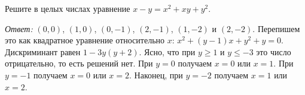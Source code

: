Решите в целых числах уравнение $x - y = x^2 + x y + y^2$.

\solution
\emph{Ответ:} $(0, 0)$, $(1, 0)$, $(0, -1)$, $(2, -1)$, $(1, -2)$ и $(2, -2)$.
Перепишем это как квадратное уравнение относительно $x$:
$x^2 + (y - 1) x + y^2 + y = 0$.
Дискриминант равен $1 - 3 y (y + 2)$.
Ясно, что при $y \geq 1$ и $y \leq -3$ это число отрицательно, то есть
решений нет.
При $y = 0$ получаем $x = 0$ или $x = 1$.
При $y = -1$ получаем $x = 0$ или $x = 2$.
Наконец, при $y = -2$ получаем $x = 1$ или $x = 2$.

